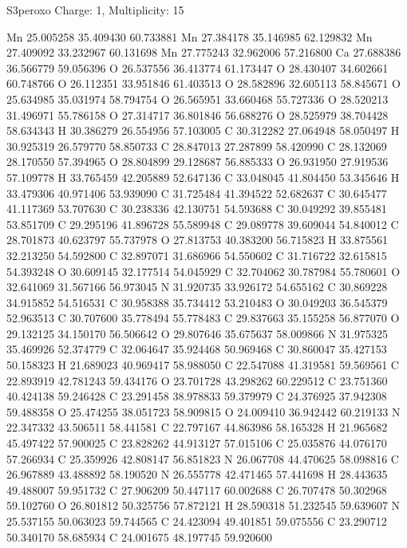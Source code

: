 \documentclass{article}
\begin{document}
S3peroxo   Charge: 1, Multiplicity: 15     
    
Mn 25.005258 35.409430 60.733881 
Mn 27.384178 35.146985 62.129832 
Mn 27.409092 33.232967 60.131698 
Mn 27.775243 32.962006 57.216800 
Ca 27.688386 36.566779 59.056396 
O 26.537556 36.413774 61.173447 
O 28.430407 34.602661 60.748766 
O 26.112351 33.951846 61.403513 
O 28.582896 32.605113 58.845671 
O 25.634985 35.031974 58.794754 
O 26.565951 33.660468 55.727336 
O 28.520213 31.496971 55.786158 
O 27.314717 36.801846 56.688276 
O 28.525979 38.704428 58.634343 
H 30.386279 26.554956 57.103005 
C 30.312282 27.064948 58.050497 
H 30.925319 26.579770 58.850733 
C 28.847013 27.287899 58.420990 
C 28.132069 28.170550 57.394965 
O 28.804899 29.128687 56.885333 
O 26.931950 27.919536 57.109778 
H 33.765459 42.205889 52.647136 
C 33.048045 41.804450 53.345646 
H 33.479306 40.971406 53.939090 
C 31.725484 41.394522 52.682637 
C 30.645477 41.117369 53.707630 
C 30.238336 42.130751 54.593688 
C 30.049292 39.855481 53.851709 
C 29.295196 41.896728 55.589948 
C 29.089778 39.609044 54.840012 
C 28.701873 40.623797 55.737978 
O 27.813753 40.383200 56.715823 
H 33.875561 32.213250 54.592800 
C 32.897071 31.686966 54.550602 
C 31.716722 32.615815 54.393248 
O 30.609145 32.177514 54.045929 
C 32.704062 30.787984 55.780601 
O 32.641069 31.567166 56.973045 
N 31.920735 33.926172 54.655162 
C 30.869228 34.915852 54.516531 
C 30.958388 35.734412 53.210483 
O 30.049203 36.545379 52.963513 
C 30.707600 35.778494 55.778483 
C 29.837663 35.155258 56.877070 
O 29.132125 34.150170 56.506642 
O 29.807646 35.675637 58.009866 
N 31.975325 35.469926 52.374779 
C 32.064647 35.924468 50.969468 
C 30.860047 35.427153 50.158323 
H 21.689023 40.969417 58.988050 
C 22.547088 41.319581 59.569561 
C 22.893919 42.781243 59.434176 
O 23.701728 43.298262 60.229512 
C 23.751360 40.424138 59.246428 
C 23.291458 38.978833 59.379979 
C 24.376925 37.942308 59.488358 
O 25.474255 38.051723 58.909815 
O 24.009410 36.942442 60.219133 
N 22.347332 43.506511 58.441581 
C 22.797167 44.863986 58.165328 
H 21.965682 45.497422 57.900025 
C 23.828262 44.913127 57.015106 
C 25.035876 44.076170 57.266934 
C 25.359926 42.808147 56.851823 
N 26.067708 44.470625 58.098816 
C 26.967889 43.488892 58.190520 
N 26.555778 42.471465 57.441698 
H 28.443635 49.488007 59.951732 
C 27.906209 50.447117 60.002688 
C 26.707478 50.302968 59.102760 
O 26.801812 50.325756 57.872121 
H 28.590318 51.232545 59.639607 
N 25.537155 50.063023 59.744565 
C 24.423094 49.401851 59.075556 
C 23.290712 50.340170 58.685934 
C 24.001675 48.197745 59.920600 
\end{document}

